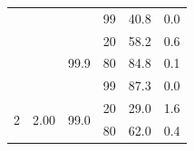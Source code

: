 \documentclass{article}
\begin{document}
\begin{table}
\begin{tabular}{|c|c|c|c|r|r|}
                                    &                                                                                        &                                                                                          & 99                                                                                      & 40.8                                                                      & 0.0                                                                       \\ \cline{3-6} 
                                    &                                                                                        & \multirow{3}{*}{99.9}                                                                    & 20                                                                                      & 58.2                                                                      & 0.6                                                                       \\ \cline{4-6} 
                                    &                                                                                        &                                                                                          & 80                                                                                      & 84.8                                                                      & 0.1                                                                       \\ \cline{4-6} 
                                    &                                                                                        &                                                                                          & 99                                                                                      & 87.3                                                                      & 0.0                                                                       \\ \hline
\multirow{12}{*}{2}                 & \multirow{6}{*}{2.00}                                                                     & \multirow{3}{*}{99.0}                                                                    & 20                                                                                      & 29.0                                                                       & 1.6                                                                       \\ \cline{4-6} 
                                    &                                                                                        &                                                                                          & 80                                                                                      & 62.0                                                                      & 0.4                                                                       \\ \cline{4-6} 

\end{tabular}
\end{table}
\end{document}
